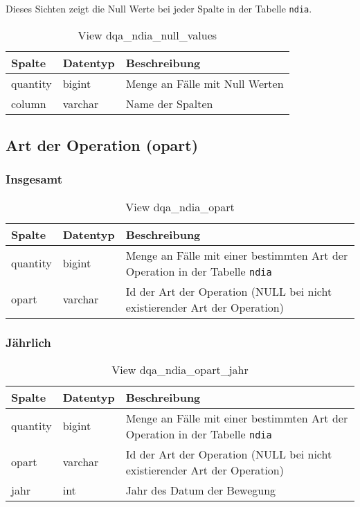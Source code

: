 Dieses Sichten zeigt die Null Werte bei jeder Spalte in der Tabelle \texttt{ndia}.

\begin{table}[ht]
	\centering   
	\caption{View dqa\_ndia\_null\_values}
	\label{tab:bewNull}
	\begin{tabular}{||l|l|p{10cm}||}   		
		\hline
		Spalte & Datentyp & Beschreibung \\ [0.5ex]
		\hline\hline
		quantity & bigint & Menge an Fälle mit Null Werten \\
		\hline
		column & varchar & Name der Spalten \\
		\hline		
	\end{tabular}
\end{table}

\subsection{Art der Operation (opart)} \label{subsec:bewOpart}

\subsubsection{Insgesamt} \label{subsubsec:bewOpartI}

\begin{table}[ht]
	\centering   
	\caption{View dqa\_ndia\_opart}
	\label{tab:bewOpartI}
	\begin{tabular}{||l|l|p{10cm}||}   		
		\hline
		Spalte & Datentyp & Beschreibung \\ [0.5ex]
		\hline\hline
		quantity & bigint & Menge an Fälle mit einer bestimmten Art der Operation in der Tabelle \texttt{ndia} \\
		\hline
		opart & varchar & Id der Art der Operation (NULL bei nicht existierender Art der Operation)\\
		\hline
	\end{tabular}
\end{table}
\newpage
\subsubsection{Jährlich} \label{subsubsec:bewOpartJ}

\begin{table}[ht]
	\centering   
	\caption{View dqa\_ndia\_opart\_jahr}
	\label{tab:bewOpartJ}
	\begin{tabular}{||l|l|p{10cm}||}   		
		\hline
		Spalte & Datentyp & Beschreibung \\ [0.5ex]
		\hline\hline
		quantity & bigint & Menge an Fälle mit einer bestimmten Art der Operation in der Tabelle \texttt{ndia}\\
		\hline
		opart & varchar & Id der Art der Operation (NULL bei nicht existierender Art der Operation)\\
		\hline
		jahr & int &  Jahr des Datum der Bewegung \\
		\hline		
	\end{tabular}
\end{table}

